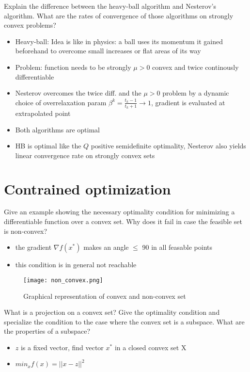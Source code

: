 \documentclass{article}
\begin{document}
\begin{question}
  Explain the difference between the heavy-ball algorithm and Nesterov’s algorithm. What are the
  rates of convergence of those algorithms on strongly convex problems?
\end{question}
\begin{itemize}
\item Heavy-ball: Idea is like in physics: a ball uses its momentum it gained beforehand to overcome
  small increases or flat areas of its way
\item Problem: function needs to be strongly $\mu > 0$ convex and twice continously differentiable
\item Nesterov overcomes the twice diff. and the $\mu > 0$ problem by a dynamic choice of
  overrelaxation param $\beta^k = \frac{t_k - 1}{t_k + 1} \rightarrow 1$, gradient is evaluated at
  extrapolated point
\item Both algorithms are optimal
\item HB is optimal like the $Q$ positive semidefinite optimality, Nesterov also yields linear
  convergence rate on strongly convex sets
\end{itemize}

\section{Contrained optimization}

\begin{question}
  Give an example showing the necessary optimality condition for minimizing a differentiable
  function over a convex set. Why does it fail in case the feasible set is non-convex?
\end{question}
\begin{itemize}
\item the gradient $\nabla f(x^*)$ makes an angle $\leq$ 90 in all feasable points
\item this condition is in general not reachable

\end{itemize}
\begin{figure}[H]
  \texttt{[image: non\_convex.png]}
  \caption{Graphical representation of convex and non-convex set \label{fig:convex}}
\end{figure}

\begin{question}
  What is a projection on a convex set? Give the optimality condition and specialize the condition
  to the case where the convex set is a subspace.  What are the properties of a subspace?
\end{question}
\begin{itemize}
\item $z$ is a fixed vector, find vector $x^*$ in a closed convex set X
\item $min_x f(x) = || x - z || ^2$
\end{itemize}
\end{document}
